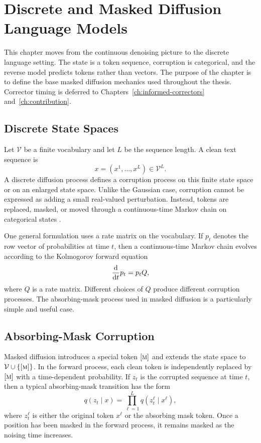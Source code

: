 \chapter{Discrete and Masked Diffusion Language Models}
\label{ch:discrete-diffusion}

This chapter moves from the continuous denoising picture to the discrete
language setting. The state is a token sequence, corruption is categorical, and
the reverse model predicts tokens rather than vectors. The purpose of the
chapter is to define the base masked diffusion mechanics used throughout the
thesis. Corrector timing is deferred to Chapters~\ref{ch:informed-correctors}
and~\ref{ch:contribution}.

\section{Discrete State Spaces}
\label{sec:ch3-discrete-state}

Let $\mathcal{V}$ be a finite vocabulary and let $L$ be the sequence length.
A clean text sequence is
\[
  x = (x^1,\ldots,x^L) \in \mathcal{V}^L .
\]
A discrete diffusion process defines a corruption process on this finite state
space or on an enlarged state space. Unlike the Gaussian case, corruption
cannot be expressed as adding a small real-valued perturbation. Instead, tokens
are replaced, masked, or moved through a continuous-time Markov chain on
categorical states \parencite{lou2024sedd}.

One general formulation uses a rate matrix on the vocabulary. If $p_t$ denotes
the row vector of probabilities at time $t$, then a continuous-time Markov
chain evolves according to the Kolmogorov forward equation
\[
  \frac{\mathop{}\!\mathrm{d}}{\mathop{}\!\mathrm{d} t}p_t = p_t Q,
\]
where $Q$ is a rate matrix. Different choices of $Q$ produce different
corruption processes. The absorbing-mask process used in masked diffusion is a
particularly simple and useful case.

\section{Absorbing-Mask Corruption}
\label{sec:ch3-absorbing-mask}

Masked diffusion introduces a special token $[\textsc{m}]$ and extends the state
space to $\mathcal{V}\cup\{[\textsc{m}]\}$. In the forward process, each clean token
is independently replaced by $[\textsc{m}]$ with a time-dependent probability. If
$z_t$ is the corrupted sequence at time $t$, then a typical absorbing-mask
transition has the form
\[
  q(z_t \mid x)
  = \prod_{\ell=1}^L q(z_t^\ell \mid x^\ell),
\]
where $z_t^\ell$ is either the original token $x^\ell$ or the absorbing mask
token. Once a position has been masked in the forward process, it remains
masked as the noising time increases.

